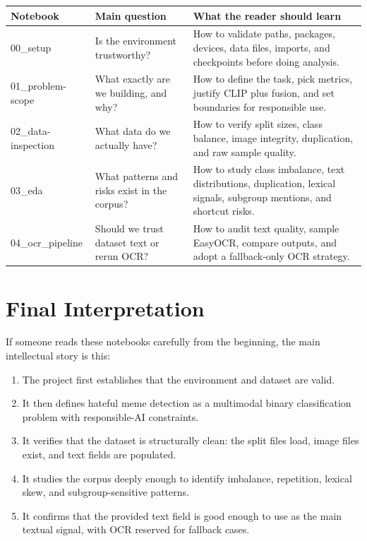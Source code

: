 \documentclass[11pt,a4paper]{report}
\begin{document}
\begin{center}
\begin{longtable}{p{}p{}p{}}
\toprule
Notebook & Main question & What the reader should learn \\
\midrule
00\_setup & Is the environment trustworthy? & How to validate paths, packages, devices, data files, imports, and checkpoints before doing analysis. \\
01\_problem-scope & What exactly are we building, and why? & How to define the task, pick metrics, justify CLIP plus fusion, and set boundaries for responsible use. \\
02\_data-inspection & What data do we actually have? & How to verify split sizes, class balance, image integrity, duplication, and raw sample quality. \\
03\_eda & What patterns and risks exist in the corpus? & How to study class imbalance, text distributions, duplication, lexical signals, subgroup mentions, and shortcut risks. \\
04\_ocr\_pipeline & Should we trust dataset text or rerun OCR? & How to audit text quality, sample EasyOCR, compare outputs, and adopt a fallback-only OCR strategy. \\
\bottomrule
\end{longtable}
\end{center}

\chapter{Final Interpretation}

If someone reads these notebooks carefully from the beginning, the main intellectual story is this:

\begin{enumerate}[label=\arabic*.]
\item The project first establishes that the environment and dataset are valid.
\item It then defines hateful meme detection as a multimodal binary classification problem with responsible-AI constraints.
\item It verifies that the dataset is structurally clean: the split files load, image files exist, and text fields are populated.
\item It studies the corpus deeply enough to identify imbalance, repetition, lexical skew, and subgroup-sensitive patterns.
\item It confirms that the provided text field is good enough to use as the main textual signal, with OCR reserved for fallback cases.
\end{enumerate}
\end{document}
